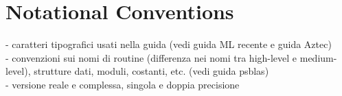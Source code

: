 \section{Notational Conventions\label{sec:conventions}}
    - caratteri tipografici usati nella guida (vedi guida ML recente e guida Aztec) \\
    - convenzioni sui nomi di routine (differenza nei nomi tra high-level e medium-level),
      strutture dati, moduli, costanti, etc. (vedi guida psblas) \\
    - versione reale e complessa, singola e doppia precisione\\
